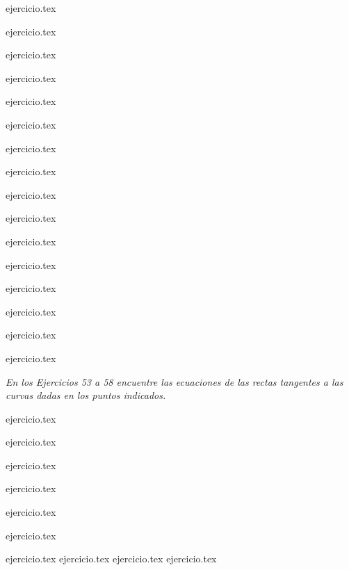 \begin{enumerate}
\begin{minipage}{0.45\textwidth}
    \addtocounter{enumi}{1}
    {ejercicio.tex}
    \addtocounter{enumi}{1}
    {ejercicio.tex}
    \addtocounter{enumi}{1}
    {ejercicio.tex}
    \addtocounter{enumi}{1}
    {ejercicio.tex}
    \addtocounter{enumi}{1}
    {ejercicio.tex}
    \addtocounter{enumi}{1}
    {ejercicio.tex}
    \addtocounter{enumi}{1}
    {ejercicio.tex}
    \addtocounter{enumi}{1}
    {ejercicio.tex}
    \addtocounter{enumi}{1}
    {ejercicio.tex}
    \addtocounter{enumi}{1}
    {ejercicio.tex}
    \addtocounter{enumi}{1}
    {ejercicio.tex}
    \addtocounter{enumi}{1}
    {ejercicio.tex}
    \addtocounter{enumi}{1}
    {ejercicio.tex}
    \addtocounter{enumi}{1}
    {ejercicio.tex}
    \addtocounter{enumi}{1}
    {ejercicio.tex}
    \addtocounter{enumi}{1}
    {ejercicio.tex}
    \end{minipage}
\end{enumerate}

\noindent \textit{En los Ejercicios 53 a 58 encuentre las ecuaciones de las rectas tangentes a las curvas dadas en los puntos indicados.}

\begin{enumerate}
    \begin{minipage}{0.45\textwidth}
    \setcounter{enumi}{52}
    {ejercicio.tex}
    \addtocounter{enumi}{1}
    {ejercicio.tex}
    \addtocounter{enumi}{1}
    {ejercicio.tex}
    \end{minipage}%
    \begin{minipage}{0.45\textwidth}
    \setcounter{enumi}{53}
    {ejercicio.tex}
    \addtocounter{enumi}{1}
    {ejercicio.tex}
    \addtocounter{enumi}{1}
    {ejercicio.tex}
    \end{minipage}
\end{enumerate}

\begin{enumerate}
    \setcounter{enumi}{58}
    {ejercicio.tex}
    {ejercicio.tex}
    {ejercicio.tex}
    {ejercicio.tex}
\end{enumerate}

